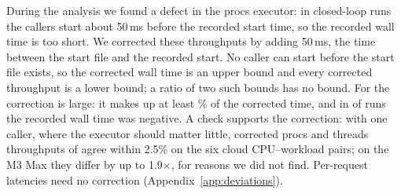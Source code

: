 During the analysis we found a defect in the procs executor: in closed-loop runs the callers start about 50\,ms before the recorded start time, so the recorded wall time is too short.
We corrected these throughputs by adding 50\,ms, the time between the start file and the recorded start. No caller can start before the start file exists, so the corrected wall time is an upper bound and every corrected throughput is a lower bound; a ratio of two such bounds has no bound.
For \sweet the correction is large: it makes up at least \% of the corrected time, and in  of  runs the recorded wall time was negative.
A check supports the correction: with one caller, where the executor should matter little, corrected procs and threads throughputs of \sweet agree within 2.5\% on the six cloud CPU--workload pairs; on the M3 Max they differ by up to 1.9$\times$, for reasons we did not find.
Per-request latencies need no correction (Appendix~\ref{app:deviations}).

\begin{table}[!htbp]
\centering\scriptsize
\setlength{\tabcolsep}{2.5pt}
\caption{Frozen parallel-caller runs, replaced by the rerun of Table~\ref{tab:conc} (previously examined sets). Closed loop per executor (procs: one process per caller; threads: one shared process): \sweet throughput in thousand calls/s, \sweet / best exact rival and \sweet / best NumKong configuration (above 1: \sweet faster; red: rival faster). $\ddagger$: the rival oversubscribed the CPU. Open loop: per-request p99 in ms at the highest common rate (calls/s), \sweet and the best exact rival (red: rival lower); $\S$: rate above the arm's closed-loop capacity. Single runs, no interval.}
\label{tab:concf}
\end{table}

